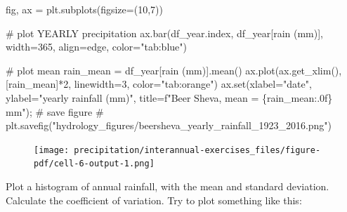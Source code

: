 \documentclass[
  letterpaper,
  DIV=11,
  numbers=noendperiod]{scrreprt}
\newenvironment{Shaded}{\begin{snugshade}}{\end{snugshade}}
\newcommand{\BuiltInTok}[1]{\textcolor[rgb]{0.00,0.23,0.31}{#1}}
\newcommand{\CommentTok}[1]{\textcolor[rgb]{0.37,0.37,0.37}{#1}}
\newcommand{\DecValTok}[1]{\textcolor[rgb]{0.68,0.00,0.00}{#1}}
\newcommand{\NormalTok}[1]{\textcolor[rgb]{0.00,0.23,0.31}{#1}}
\newcommand{\OperatorTok}[1]{\textcolor[rgb]{0.37,0.37,0.37}{#1}}
\newcommand{\SpecialCharTok}[1]{\textcolor[rgb]{0.37,0.37,0.37}{#1}}
\newcommand{\SpecialStringTok}[1]{\textcolor[rgb]{0.13,0.47,0.30}{#1}}
\newcommand{\StringTok}[1]{\textcolor[rgb]{0.13,0.47,0.30}{#1}}
\begin{document}
\begin{Shaded}
\begin{Highlighting}[]
\NormalTok{fig, ax }\OperatorTok{=}\NormalTok{ plt.subplots(figsize}\OperatorTok{=}\NormalTok{(}\DecValTok{10}\NormalTok{,}\DecValTok{7}\NormalTok{))}

\CommentTok{\# plot YEARLY precipitation}
\NormalTok{ax.bar(df\_year.index, df\_year[}\StringTok{\textquotesingle{}rain (mm)\textquotesingle{}}\NormalTok{],}
\NormalTok{       width}\OperatorTok{=}\DecValTok{365}\NormalTok{, align}\OperatorTok{=}\StringTok{\textquotesingle{}edge\textquotesingle{}}\NormalTok{, color}\OperatorTok{=}\StringTok{"tab:blue"}\NormalTok{)}

\CommentTok{\# plot mean}
\NormalTok{rain\_mean }\OperatorTok{=}\NormalTok{ df\_year[}\StringTok{\textquotesingle{}rain (mm)\textquotesingle{}}\NormalTok{].mean()}
\NormalTok{ax.plot(ax.get\_xlim(), [rain\_mean]}\OperatorTok{*}\DecValTok{2}\NormalTok{, linewidth}\OperatorTok{=}\DecValTok{3}\NormalTok{, color}\OperatorTok{=}\StringTok{"tab:orange"}\NormalTok{)}
\NormalTok{ax.}\BuiltInTok{set}\NormalTok{(xlabel}\OperatorTok{=}\StringTok{"date"}\NormalTok{,}
\NormalTok{       ylabel}\OperatorTok{=}\StringTok{"yearly rainfall (mm)"}\NormalTok{,}
\NormalTok{       title}\OperatorTok{=}\SpecialStringTok{f"Beer Sheva, mean = }\SpecialCharTok{\{}\NormalTok{rain\_mean}\SpecialCharTok{:.0f\}}\SpecialStringTok{ mm"}\NormalTok{)}\OperatorTok{;}
\CommentTok{\# save figure}
\CommentTok{\# plt.savefig("hydrology\_figures/beersheva\_yearly\_rainfall\_1923\_2016.png")}
\end{Highlighting}
\end{Shaded}

\begin{figure}[H]

{\centering \texttt{[image: precipitation/interannual-exercises\_files/figure-pdf/cell-6-output-1.png]}

}

\end{figure}

Plot a histogram of annual rainfall, with the mean and standard
deviation. Calculate the coefficient of variation. Try to plot something
like this:
\end{document}
